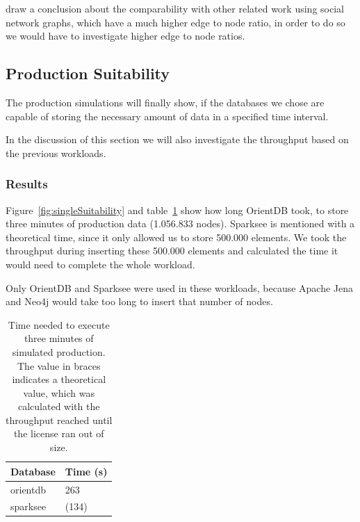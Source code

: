  draw a conclusion about the comparability with other related work using social network graphs,
which have a much higher edge to node ratio,
in order to do so we would have to investigate higher edge to node ratios.

\subsection{Production Suitability}
\label{ch:evaluation:se:productionSuitability}
The production simulations will finally show,
if the databases we chose are capable of storing the necessary amount of data in a specified time interval.

In the discussion of this section we will also investigate the throughput based on the previous workloads.

\subsubsection{Results}
Figure~\ref{fig:singleSuitability} and table~\ref{tab:singleSuitability} show how long OrientDB took,
to store three minutes of production data (1.056.833 nodes).
Sparksee is mentioned with a theoretical time,
since it only allowed us to store 500.000 elements.
We took the throughput during inserting these 500.000 elements and calculated the time it would need to complete the whole workload.

Only OrientDB and Sparksee were used in these workloads,
because Apache Jena and Neo4j would take too long to insert that number of nodes.

\begin{table}[h!]
  \begin{minipage}{\textwidth}
    \centering
    \begin{tabular}{ | l | l | }
      \hline
      Database & Time (s) \\ \hline
      orientdb & 263 \\ \hline
      sparksee & (134) \\ \hline
    \end{tabular}
  \end{minipage}
  \caption{Time needed to execute three minutes of simulated production.
  The value in braces indicates a theoretical value,
  which was calculated with the throughput reached until the license ran out of size.}
  \label{tab:singleSuitability}
\end{table}

